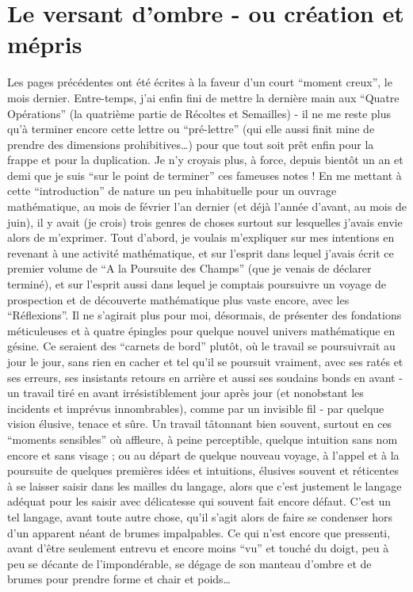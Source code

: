 \section{Le versant d'ombre - ou création et mépris}

Les pages précédentes ont été écrites à la faveur d'un court ``moment creux'', le mois dernier. Entre-temps, j'ai enfin fini de mettre la dernière main aux ``Quatre Opérations'' (la quatrième partie de Récoltes et Semailles) - il ne me reste plus qu'à terminer encore cette lettre ou ``pré-lettre'' (qui elle aussi finit mine de prendre des dimensions prohibitives\ldots) pour que tout soit prêt enfin pour la frappe et pour la duplication. Je n'y croyais plus, à force, depuis bientôt un an et demi que je suis ``sur le point de terminer'' ces fameuses notes ! En me mettant à cette ``introduction'' de nature un peu inhabituelle pour un ouvrage mathématique, au mois de février l'an dernier (et déjà l'année d'avant, au mois de juin), il y avait (je crois) trois genres de choses surtout sur lesquelles j'avais envie alors de m'exprimer. Tout d'abord, je voulais m'expliquer sur mes intentions en revenant à une activité mathématique, et sur l'esprit dans lequel j'avais écrit ce premier volume de ``A la Poursuite des Champs'' (que je venais de déclarer terminé), et sur l'esprit aussi dans lequel je comptais poursuivre un voyage de prospection et de découverte mathématique plus vaste encore, avec les ``Réflexions''. Il ne s'agirait plus pour moi, désormais, de présenter des fondations méticuleuses et à quatre épingles pour quelque nouvel univers mathématique en gésine. Ce seraient des ``carnets de bord'' plutôt, où le travail se poursuivrait au jour le jour, sans rien en cacher et tel qu'il se poursuit vraiment, avec ses ratés et ses erreurs, ses insistants retours en arrière et aussi ses soudains bonds en avant - un travail tiré en avant irrésistiblement jour après jour (et nonobstant les incidents et imprévus innombrables), comme par un invisible fil - par quelque vision élusive, tenace et sûre. Un travail tâtonnant bien souvent, surtout en ces ``moments sensibles'' où affleure, à peine perceptible, quelque intuition sans nom encore et sans visage ; ou au départ de quelque nouveau voyage, à l'appel et à la poursuite de quelques premières idées et intuitions, élusives souvent et réticentes à se laisser saisir dans les mailles du langage, alors que c'est justement le langage adéquat pour les saisir avec délicatesse qui souvent fait encore défaut. C'est un tel langage, avant toute autre chose, qu'il s'agit alors de faire se condenser hors d'un apparent néant de brumes impalpables. Ce qui n'est encore que pressenti, avant d'être seulement entrevu et encore moins ``vu'' et touché du doigt, peu à peu se décante de l'impondérable, se dégage de son manteau d'ombre et de brumes pour prendre forme et chair et poids\ldots

